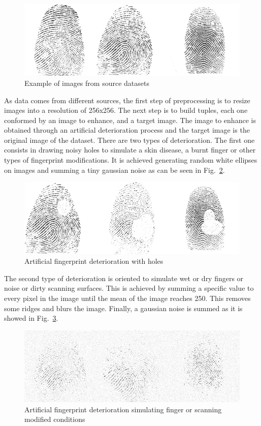 \documentclass[a4paper,fleqn]{cas-dc}
\begin{document}
\begin{figure}[htbp]
\centerline{\includegraphics[scale=0.3]{figs/dataset_example.png}}
\caption{Example of images from source datasets}
\label{fig1}
\end{figure}

As data comes from different sources, the first step of preprocessing is to resize images into a resolution of 256x256. The next step is to build tuples, each one conformed by an image to enhance, and a target image. The image to enhance is obtained through an artificial deterioration process and the target image is the original image of the dataset. There are two types of deterioration. The first one consists in drawing noisy holes to simulate a skin disease, a burnt finger or other types of fingerprint modifications. It is achieved generating random white ellipses on images and summing a tiny gaussian noise as can be seen in Fig.~\ref{fig2}.

\begin{figure}[htbp]
\centerline{\includegraphics[scale=0.3]{figs/deterioration_1.png}}
\caption{Artificial fingerprint deterioration with holes}
\label{fig2}
\end{figure}

The second type of deterioration is oriented to simulate wet or dry fingers or noise or dirty scanning surfaces. This is achieved by summing a specific value to every pixel in the image until the mean of the image reaches 250. This removes some ridges and blurs the image. Finally, a gaussian noise is summed as it is showed in Fig.~\ref{fig3}.

\begin{figure}[htbp]
\centerline{\includegraphics[scale=0.32]{figs/deterioration_2.png}}
\caption{Artificial fingerprint deterioration simulating finger or scanning modified conditions}
\label{fig3}
\end{figure}
\end{document}
